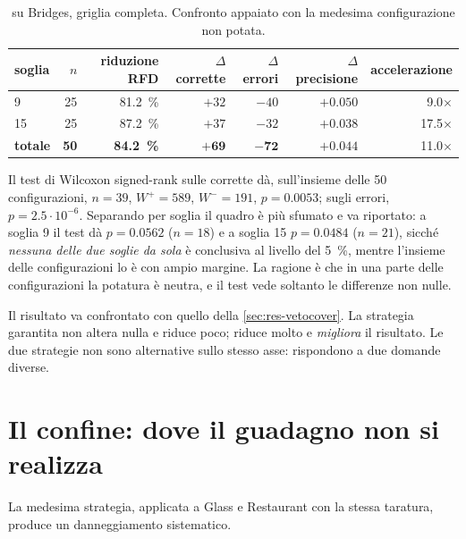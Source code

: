 \begin{table}[htbp]
\centering
\caption{ su Bridges, griglia completa. Confronto appaiato con la medesima
configurazione non potata.}
\label{tab:res-a5b}
\footnotesize
\begin{tabular}{lrrrrrr}
\toprule
soglia & $n$ & riduzione RFD & $\Delta$ corrette & $\Delta$ errori & $\Delta$ precisione & accelerazione \\
\midrule
9  & 25 & \SI{81.2}{\percent} & $+32$ & $-40$ & $+0.050$ & \num{9.0}$\times$ \\
15 & 25 & \SI{87.2}{\percent} & $+37$ & $-32$ & $+0.038$ & \num{17.5}$\times$ \\
\midrule
\textbf{totale} & \textbf{50} & \textbf{\SI{84.2}{\percent}} & $\mathbf{+69}$ & $\mathbf{-72}$ & $+0.044$ & \num{11.0}$\times$ \\
\bottomrule
\end{tabular}
\end{table}

Il test di Wilcoxon signed-rank sulle corrette dà, sull'insieme delle \num{50} configurazioni,
$n = 39$, $W^+ = 589$, $W^- = 191$, $p = \num{0.0053}$; sugli errori, $p = 2.5\cdot 10^{-6}$. Separando
per soglia il quadro è più sfumato e va riportato: a soglia 9 il test dà $p = \num{0.0562}$
($n = 18$) e a soglia 15 $p = \num{0.0484}$ ($n = 21$), sicché \emph{nessuna delle due soglie da
sola} è conclusiva al livello del \SI{5}{\percent}, mentre l'insieme delle configurazioni lo è
con ampio margine. La ragione è che in una parte delle configurazioni la potatura è neutra, e il
test vede soltanto le differenze non nulle.

Il risultato va confrontato con quello della \autoref{sec:res-vetocover}. La strategia garantita
non altera nulla e riduce poco;  riduce molto e \emph{migliora} il risultato. Le due
strategie non sono alternative sullo stesso asse: rispondono a due domande diverse.

\section{Il confine: dove il guadagno non si realizza}\label{sec:res-boundary}

La medesima strategia, applicata a Glass e Restaurant con la stessa taratura, produce un
danneggiamento sistematico.

